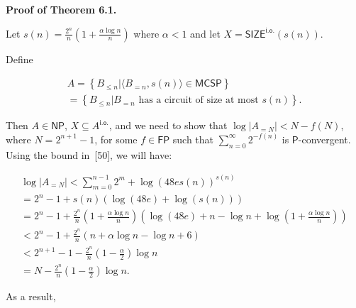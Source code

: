\documentclass[10pt,a4paper]{article}
\begin{document}



\par\medskip\noindent\textbf{Proof of Theorem 6.1.}\par




Let $s(n)=\frac{2^{n}}{n}\left(1+\frac{\alpha\log n}{n}\right)$ where $\alpha<1$ and let $X=\mathsf{SIZE}^{\mathsf{i.o.}}\!\!(s(n))$.\par




Define\par


\[\begin{gathered}
\displaystyle A \displaystyle= \displaystyle\left\{B_{\leq n}\left|\langle B_{=n},s(n)\rangle\in\mathsf{MCSP}\right.\right\} \\
\displaystyle= \displaystyle\left\{B_{\leq n}\left|B_{=n}\text{ has a circuit of size at most }s(n)\right.\right\}.
\end{gathered}\]


Then $A\in\mathsf{NP}$, $X\subseteq A^{\mathsf{i.o.}}$, and we need to show that $\log|A_{=N}|<N-f(N)$, where $N=2^{n+1}-1$, for some $f\in\mathsf{FP}$ such that $\sum_{n=0}^{\infty}2^{-f(n)}$ is $\mathsf{P}$-convergent. Using the bound in [50], we will have:\par


\[\begin{gathered}
\displaystyle\log|A_{=N}| \displaystyle< \displaystyle\sum\limits_{m=0}^{n-1}2^{m}+\log\left(48es\left(n\right)\right)^{s(n)} \\
\displaystyle= \displaystyle 2^{n}-1+s(n)\left(\log(48e)+\log\left(s\left(n\right)\right)\right) \\
\displaystyle= \displaystyle 2^{n}-1+\frac{2^{n}}{n}\left(1+\frac{\alpha\log n}{n}\right)\left(\log\left(48e\right)+n-\log n+\log\left(1+\frac{\alpha\log n}{n}\right)\right) \\
\displaystyle< \displaystyle 2^{n}-1+\frac{2^{n}}{n}\left(n+\alpha\log n-\log n+6\right) \\
\displaystyle< \displaystyle 2^{n+1}-1-\frac{2^{n}}{n}\left(1-\frac{\alpha}{2}\right)\log n \\
\displaystyle= \displaystyle N-\frac{2^{n}}{n}\left(1-\frac{\alpha}{2}\right)\log n.
\end{gathered}\]


As a result,\par
\end{document}

